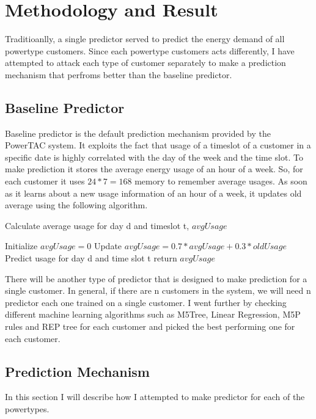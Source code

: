 
\chapter{Methodology and Result}

Traditioanlly, a single predictor served to predict the energy demand of all powertype customers. Since each powertype customers acts differently, I have attempted to attack each type of customer separately to make a prediction mechanism that perfroms better than the baseline predictor.

\section{Baseline Predictor}
Baseline predictor is the default prediction mechanism provided by the PowerTAC system. It exploits the fact that usage of a timeslot of a customer in a specific date is highly correlated with the day of the week and the time slot. To make prediction it stores the average energy usage of an hour of a week. So, for each customer it uses $24*7 = 168$ memory to remember average usages. As soon as it learns about a new usage information of an hour of a week, it updates old average using the following algorithm.


\begin{algorithm}
\caption{Calculate average usage for day d and timeslot t, $avgUsage$}
\begin{algorithmic} 
\STATE Initialize
\STATE $avgUsage = 0$
\STATE Update
\STATE $avgUsage = 0.7 * avgUsage + 0.3 * oldUsage$
\STATE Predict usage for day d and time slot t
\STATE return $avgUsage$
\end{algorithmic}
\end{algorithm}

There will be another type of predictor that is designed to make prediction for a single customer. In general, if there are n customers in the system, we will need n predictor each one trained on a single customer. I went further by checking different machine learning algorithms such as M5Tree, Linear Regression, M5P rules and REP tree for each customer and picked the best performing one for each customer.

\section{Prediction Mechanism}

In this section I will describe how I attempted to make predictor for each of the powertypes.

